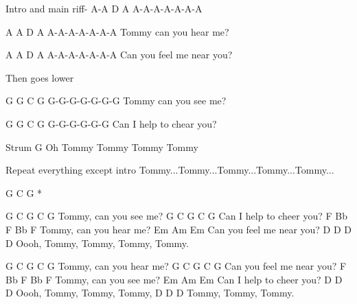 

Intro and main riff- A-A D A  A-A-A-A-A-A-A

A         A   D    A    A-A-A-A-A-A-A
Tommy can you hear me? 

A            A  D    A    A-A-A-A-A-A-A
Can you feel me near you? 

Then goes lower

G         G   C   G   G-G-G-G-G-G-G
Tommy can you see me?

G          G  C     G    G-G-G-G-G-G
Can I help to chear you?

Strum G
Oh Tommy Tommy Tommy Tommy 

Repeat everything except intro
Tommy...Tommy...Tommy...Tommy...Tommy...






G C G *

G              C   G  C G
Tommy, can you see me?
G             C     G   C G
Can I help to cheer you?
F              Bb   F  Bb F
Tommy, can you hear me?
Em              Am   Em
Can you feel me near you?
      D      D      D      D
Oooh, Tommy, Tommy, Tommy, Tommy.

G              C    G  C G
Tommy, can you hear me?
G               C    G   C G
Can you feel me near you?
F              Bb  F   Bb F
Tommy, can you see me?
Em            Am    Em
Can I help to cheer you?
      D      D      D
Oooh, Tommy, Tommy, Tommy, 
D      D      D
Tommy, Tommy, Tommy.


